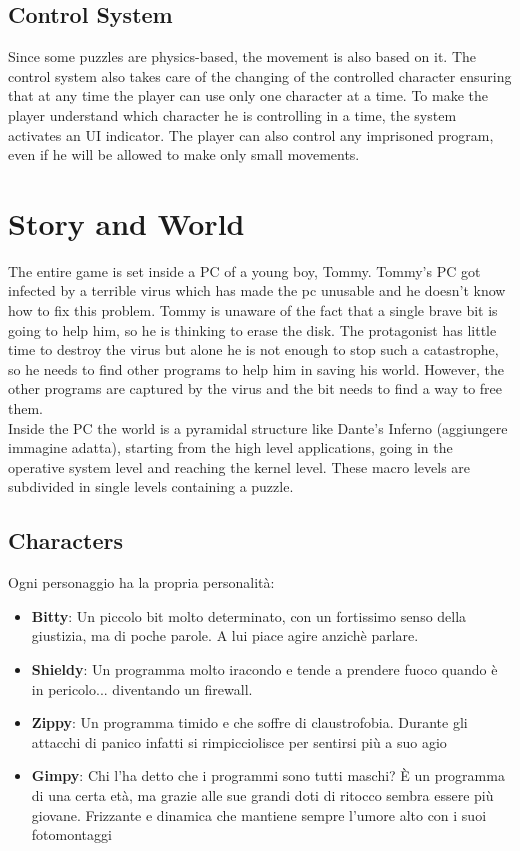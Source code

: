 \documentclass[12pt, a4paper]{report}
\begin{document}
\section*{Control System}
Since some puzzles are physics-based, the movement is also based on it. The control system also takes care of the changing of the controlled character ensuring that at any time the player can use only one character at a time. To make the player understand which character he is controlling in a time, the system activates an UI indicator. The player can also control any imprisoned program, even if he will be allowed to make only small movements.



\chapter{Story and World}
The entire game is set inside a PC of a young boy, Tommy. Tommy’s PC got infected by a terrible virus which has made the pc unusable and he doesn’t know how to fix this problem. Tommy is unaware of the fact that a single brave bit is going to help him, so he is thinking to erase the disk. The protagonist has little time to destroy the virus but alone he is not enough to stop such a catastrophe, so he needs to find other programs to help him in saving his world. However, the other programs are captured by the virus and the bit needs to find a way to free them.\\
Inside the PC the world is a pyramidal structure like Dante’s Inferno (aggiungere immagine adatta), starting from the high level applications, going in the operative system level and reaching the kernel level. These macro levels are subdivided in single levels containing a puzzle.

\section*{Characters}
Ogni personaggio ha la propria personalità:
\begin{itemize}
\item \textbf{Bitty}: Un piccolo bit molto determinato, con un fortissimo senso della giustizia, ma di poche parole. A lui piace agire anzichè parlare.
\item \textbf{Shieldy}: Un programma molto iracondo e tende a prendere fuoco quando è in pericolo... diventando un firewall.
\item \textbf{Zippy}: Un programma timido e che soffre di claustrofobia. Durante gli attacchi di panico infatti si rimpicciolisce per sentirsi più a suo agio
\item \textbf{Gimpy}: Chi l'ha detto che i programmi sono tutti maschi? È un programma di una certa età, ma grazie alle sue grandi doti di ritocco sembra essere più giovane. Frizzante e dinamica che mantiene sempre l'umore alto con i suoi fotomontaggi
\end{itemize}
\end{document}
